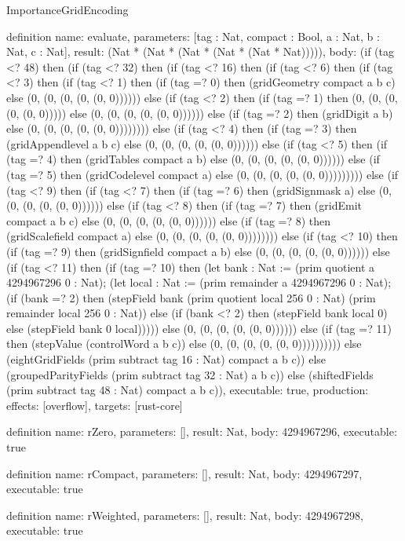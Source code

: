 \begin{lexlean}{ImportanceGridEncoding}
\begin{semanticmodule}
definition{
  name: evaluate,
  parameters: [tag : Nat, compact : Bool, a : Nat, b : Nat, c : Nat],
  result: (Nat * (Nat * (Nat * (Nat * (Nat * Nat))))),
  body: (if (tag <? 48) then (if (tag <? 32) then (if (tag <? 16) then (if (tag <? 6) then
      (if (tag <? 3) then
      (if (tag <? 1) then
      (if (tag =? 0) then (gridGeometry compact a b c) else (0, (0, (0, (0, (0, 0)))))) else
      (if (tag <? 2) then
      (if (tag =? 1) then (0, (0, (0, (0, (0, 0))))) else (0, (0, (0, (0, (0, 0)))))) else
      (if (tag =? 2) then (gridDigit a b) else (0, (0, (0, (0, (0, 0)))))))) else
      (if (tag <? 4) then
      (if (tag =? 3) then (gridAppendlevel a b c) else (0, (0, (0, (0, (0, 0)))))) else
      (if (tag <? 5) then
      (if (tag =? 4) then (gridTables compact a b) else (0, (0, (0, (0, (0, 0)))))) else
      (if (tag =? 5) then (gridCodelevel compact a) else (0, (0, (0, (0, (0, 0))))))))) else
      (if (tag <? 9) then
      (if (tag <? 7) then
      (if (tag =? 6) then (gridSignmask a) else (0, (0, (0, (0, (0, 0)))))) else
      (if (tag <? 8) then
      (if (tag =? 7) then (gridEmit compact a b c) else (0, (0, (0, (0, (0, 0)))))) else
      (if (tag =? 8) then (gridScalefield compact a) else (0, (0, (0, (0, (0, 0)))))))) else
      (if (tag <? 10) then
      (if (tag =? 9) then (gridSignfield compact a b) else (0, (0, (0, (0, (0, 0)))))) else
      (if (tag <? 11) then
      (if (tag =? 10) then (let bank : Nat := (prim quotient a 4294967296 0 : Nat); (let local : Nat := (prim remainder a 4294967296 0 : Nat); (if (bank =? 2) then (stepField bank (prim quotient local 256 0 : Nat) (prim remainder local 256 0 : Nat)) else (if (bank <? 2) then (stepField bank local 0) else (stepField bank 0 local))))) else (0, (0, (0, (0, (0, 0)))))) else
      (if (tag =? 11) then (stepValue (controlWord a b c)) else (0, (0, (0, (0, (0, 0)))))))))) else (eightGridFields (prim subtract tag 16 : Nat) compact a b c)) else (groupedParityFields (prim subtract tag 32 : Nat) a b c)) else (shiftedFields (prim subtract tag 48 : Nat) compact a b c)),
  executable: true,
  production: {effects: [overflow], targets: [rust-core]}
}

definition{
  name: rZero,
  parameters: [],
  result: Nat,
  body: 4294967296,
  executable: true
}

definition{
  name: rCompact,
  parameters: [],
  result: Nat,
  body: 4294967297,
  executable: true
}

definition{
  name: rWeighted,
  parameters: [],
  result: Nat,
  body: 4294967298,
  executable: true
}


\end{semanticmodule}
\end{lexlean}
